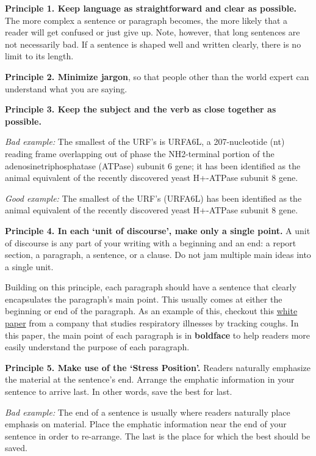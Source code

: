 \documentclass[
]{book}
\begin{document}
\textbf{Principle 1. Keep language as straightforward and clear as possible.} The more complex a sentence or paragraph becomes, the more likely that a reader will get confused or just give up. Note, however, that long sentences are not necessarily bad. If a sentence is shaped well and written clearly, there is no limit to its length.

\textbf{Principle 2. Minimize jargon}, so that people other than the world expert can understand what you are saying.

\textbf{Principle 3. Keep the subject and the verb as close together as possible.}

\emph{Bad example:} The smallest of the URF's is URFA6L, a 207-nucleotide (nt) reading frame overlapping out of phase the NH2-terminal portion of the adenosinetriphosphatase (ATPase) subunit 6 gene; it has been identified as the animal equivalent of the recently discovered yeast H+-ATPase subunit 8 gene.

\emph{Good example:} The smallest of the URF's (URFA6L) has been identified as the animal equivalent of the recently discovered yeast H+-ATPase subunit 8 gene.

\textbf{Principle 4. In each `unit of discourse', make only a single point.} A unit of discourse is any part of your writing with a beginning and an end: a report section, a paragraph, a sentence, or a clause. Do not jam multiple main ideas into a single unit.

Building on this principle, each paragraph should have a sentence that clearly encapsulates the paragraph's main point. This usually comes at either the beginning or end of the paragraph. As an example of this, checkout this \href{https://uploads-ssl.webflow.com/601331581ba868154325e525/604287b91aab4e5c89de8e0e_Hyfe\%20Smart\%20Cough\%20Monitoring.pdf}{white paper} from a company that studies respiratory illnesses by tracking coughs. In this paper, the main point of each paragraph is in \textbf{boldface} to help readers more easily understand the purpose of each paragraph.

\textbf{Principle 5. Make use of the `Stress Position'.} Readers naturally emphasize the material at the sentence's end. Arrange the emphatic information in your sentence to arrive last. In other words, save the best for last.

\emph{Bad example:} The end of a sentence is usually where readers naturally place emphasis on material. Place the emphatic information near the end of your sentence in order to re-arrange. The last is the place for which the best should be saved.
\end{document}
